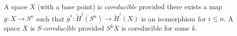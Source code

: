 A space $X$ (with a base point) is \emph{coreducible} provided there exists a map $g: X \rightarrow S^n$ such that $g^*: \tilde{H}^i(S^n) \rightarrow \tilde{H}^i(X)$ is an isomorphism for $i \leq n$. A space $X$ is \emph{$S$-coreducible} provided $S^k X$ is coreducible for some $k$.
